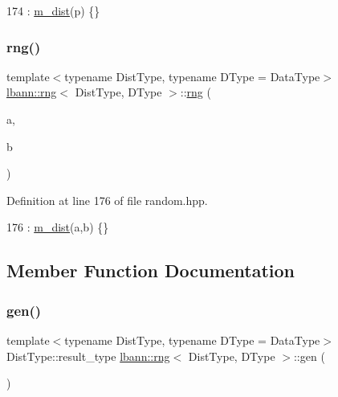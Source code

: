\begin{DoxyCode}
174 : \hyperlink{classlbann_1_1rng_a07a437f5344e29d6cf557e95ae83a24c}{m\_dist}(p) \{\}
\end{DoxyCode}
\mbox{\label{classlbann_1_1rng_aede986b92f5d075b4881f8cca86459dd}} 
\subsubsection{\texorpdfstring{rng()}{rng()}\hspace{0.1cm}{\footnotesize\ttfamily [3/3]}}
{\footnotesize\ttfamily template$<$typename Dist\+Type, typename D\+Type = Data\+Type$>$ \\
\hyperlink{classlbann_1_1rng}{lbann\+::rng}$<$ Dist\+Type, D\+Type $>$\+::\hyperlink{classlbann_1_1rng}{rng} (\begin{DoxyParamCaption}\item[{D\+Type}]{a,  }\item[{D\+Type}]{b }\end{DoxyParamCaption})\hspace{0.3cm}{\ttfamily [inline]}}



Definition at line 176 of file random.\+hpp.


\begin{DoxyCode}
176 : \hyperlink{classlbann_1_1rng_a07a437f5344e29d6cf557e95ae83a24c}{m\_dist}(a,b) \{\}
\end{DoxyCode}


\subsection{Member Function Documentation}
\mbox{\label{classlbann_1_1rng_a1c8a2640dd522c6fc63bf2de09ff3e84}} 
\subsubsection{\texorpdfstring{gen()}{gen()}}
{\footnotesize\ttfamily template$<$typename Dist\+Type, typename D\+Type = Data\+Type$>$ \\
Dist\+Type\+::result\+\_\+type \hyperlink{classlbann_1_1rng}{lbann\+::rng}$<$ Dist\+Type, D\+Type $>$\+::gen (\begin{DoxyParamCaption}{ }\end{DoxyParamCaption})\hspace{0.3cm}{\ttfamily [inline]}}




